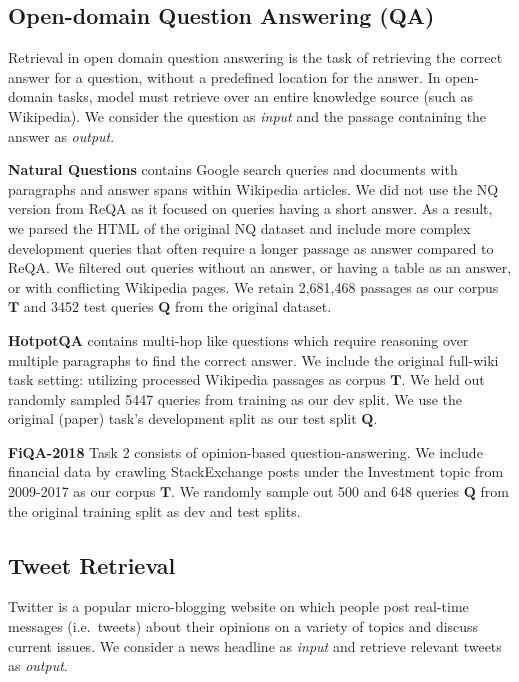 \documentclass{article}
\begin{document}
\vspace{-1mm}
\subsection{Open-domain Question Answering (QA)}
\vspace{-2mm}

Retrieval in open domain question answering \cite{chen-etal-2017-reading} is the task of retrieving the correct answer for a question, without a predefined location for the answer. In open-domain tasks, model must retrieve over an entire knowledge source (such as Wikipedia). We consider the question as \textit{input} and the passage containing the answer as \textit{output}.

\textbf{Natural Questions} \cite{47761} contains Google search queries and documents with paragraphs and answer spans within Wikipedia articles. We did not use the NQ version from ReQA \cite{ahmad-etal-2019-reqa} as it focused on queries having a short answer. As a result, we parsed the HTML of the original NQ dataset and include more complex development queries that often require a longer passage as answer compared to ReQA. We filtered out queries without an answer, or having a table as an answer, or with conflicting Wikipedia pages. We retain 2,681,468 passages as our corpus $\mathbf{T}$ and 3452 test queries $\mathbf{Q}$ from the original dataset.

\textbf{HotpotQA} \cite{yang-etal-2018-hotpotqa} contains multi-hop like questions which require reasoning over multiple paragraphs to find the correct answer. We include the original full-wiki task setting: utilizing processed Wikipedia passages as corpus $\mathbf{T}$. We held out randomly sampled 5447 queries from training as our dev split. We use the original (paper) task's development split as our test split $\mathbf{Q}$.

 \textbf{FiQA-2018} \cite{10.1145/3184558.3192301} Task 2 consists of opinion-based question-answering. We include financial data by crawling StackExchange posts under the Investment topic from 2009-2017 as our corpus $\mathbf{T}$. We randomly sample out 500 and 648 queries $\mathbf{Q}$ from the original training split as dev and test splits.

\vspace{-2mm}
\subsection{Tweet Retrieval}
\vspace{-1mm}
Twitter is a popular micro-blogging website on which people post real-time messages (i.e.\ tweets) about their opinions on a variety of topics and discuss current issues. We consider a news headline as \textit{input} and retrieve relevant tweets as \textit{output}.
\end{document}
